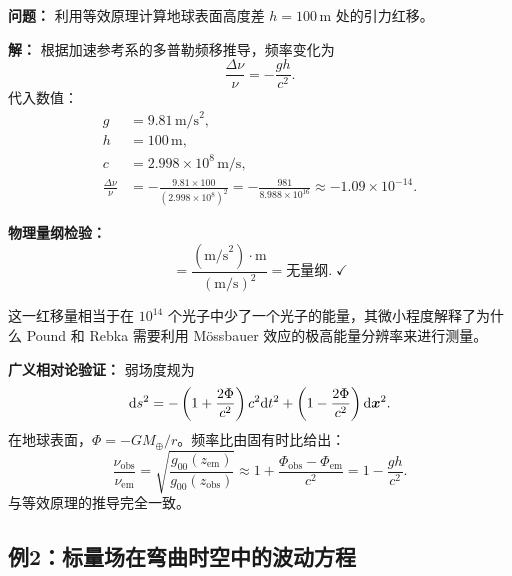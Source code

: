 \begin{example}[地球表面引力红移的定量预测]
\textbf{问题：} 利用等效原理计算地球表面高度差 $h=100\,\text{m}$ 处的引力红移。

\textbf{解：} 根据加速参考系的多普勒频移推导，频率变化为
\begin{equation}
    \frac{\Delta\nu}{\nu} = -\frac{gh}{c^2}.
\end{equation}
代入数值：
\begin{align}
    g &= 9.81 \,\text{m/s}^2, \\
    h &= 100 \,\text{m}, \\
    c &= 2.998 \times 10^8 \,\text{m/s}, \\[4pt]
    \frac{\Delta\nu}{\nu} &= -\frac{9.81 \times 100}{(2.998 \times 10^8)^2} 
    = -\frac{981}{8.988 \times 10^{16}} \approx -1.09 \times 10^{-14}.
\end{align}

\textbf{物理量纲检验：}
\begin{equation}
    [gh/c^2] = \frac{(\text{m/s}^2) \cdot \text{m}}{(\text{m/s})^2} = \text{无量纲}. \; \checkmark
\end{equation}

这一红移量相当于在 $10^{14}$ 个光子中少了一个光子的能量，其微小程度解释了为什么 Pound 和 Rebka 需要利用 M\"{o}ssbauer 效应的极高能量分辨率来进行测量。

\textbf{广义相对论验证：} 弱场度规为
\begin{equation}
    \dd s^2 = -\left(1 + \frac{2\Phi}{c^2}\right) c^2 \dd t^2 + \left(1 - \frac{2\Phi}{c^2}\right) \dd \vb*{x}^2.
\end{equation}
在地球表面，$\Phi = -GM_\oplus/r$。频率比由固有时比给出：
\begin{equation}
    \frac{\nu_{\text{obs}}}{\nu_{\text{em}}} = \sqrt{\frac{g_{00}(z_{\text{em}})}{g_{00}(z_{\text{obs}})}} 
    \approx 1 + \frac{\Phi_{\text{obs}} - \Phi_{\text{em}}}{c^2} = 1 - \frac{gh}{c^2}.
\end{equation}
与等效原理的推导完全一致。
\end{example}

\subsection{例2：标量场在弯曲时空中的波动方程}

